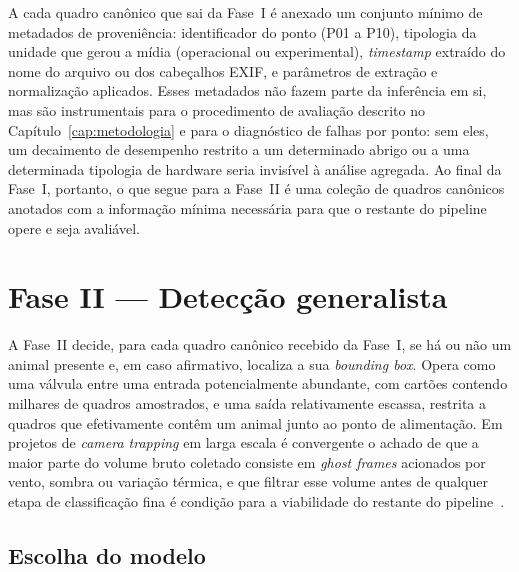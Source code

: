 A cada quadro canônico que sai da Fase~I é anexado um conjunto mínimo de metadados de proveniência: identificador do ponto (P01 a P10), tipologia da unidade que gerou a mídia (operacional ou experimental), \textit{timestamp} extraído do nome do arquivo ou dos cabeçalhos EXIF, e parâmetros de extração e normalização aplicados. Esses metadados não fazem parte da inferência em si, mas são instrumentais para o procedimento de avaliação descrito no Capítulo~\ref{cap:metodologia} e para o diagnóstico de falhas por ponto: sem eles, um decaimento de desempenho restrito a um determinado abrigo ou a uma determinada tipologia de hardware seria invisível à análise agregada. Ao final da Fase~I, portanto, o que segue para a Fase~II é uma coleção de quadros canônicos anotados com a informação mínima necessária para que o restante do pipeline opere e seja avaliável.

\section{Fase II --- Detecção generalista}
\label{sec:pipeline-fase2}

A Fase~II decide, para cada quadro canônico recebido da Fase~I, se há ou não um animal presente e, em caso afirmativo, localiza a sua \textit{bounding box}. Opera como uma válvula entre uma entrada potencialmente abundante, com cartões contendo milhares de quadros amostrados, e uma saída relativamente escassa, restrita a quadros que efetivamente contêm um animal junto ao ponto de alimentação. Em projetos de \textit{camera trapping} em larga escala é convergente o achado de que a maior parte do volume bruto coletado consiste em \textit{ghost frames} acionados por vento, sombra ou variação térmica, e que filtrar esse volume antes de qualquer etapa de classificação fina é condição para a viabilidade do restante do pipeline~\cite{bruce2025largescale,velez2022choosing,swanson2015snapshot,mulero2025addressing}.

\subsection*{Escolha do modelo}

